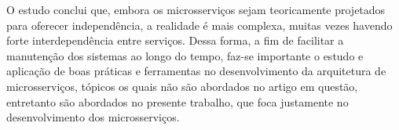 O estudo conclui que, embora os microsserviços sejam teoricamente projetados para oferecer independência, a realidade é mais complexa, muitas vezes havendo forte interdependência entre serviços. Dessa forma, a fim de facilitar a manutenção dos sistemas ao longo do tempo, faz-se importante o estudo e aplicação de boas práticas e ferramentas no desenvolvimento da arquitetura de microsserviços, tópicos os quais não são abordados no artigo em questão, entretanto são abordados no presente trabalho, que foca justamente no desenvolvimento dos microsserviços.






